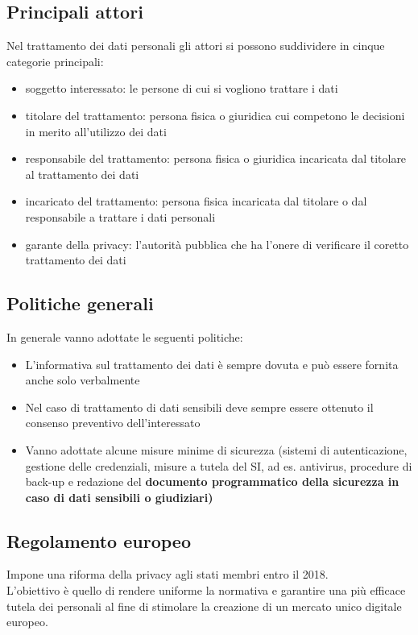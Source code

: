 \subsection{Principali attori}
Nel trattamento dei dati personali gli attori si possono suddividere in cinque categorie principali:
\begin{itemize}
	\item soggetto interessato: le persone di cui si vogliono trattare i dati
	\item titolare del trattamento: persona fisica o giuridica cui competono le decisioni in merito
all’utilizzo dei dati
	\item responsabile del trattamento: persona fisica o giuridica incaricata dal titolare al trattamento dei dati
	\item incaricato del trattamento: persona fisica incaricata dal titolare o dal responsabile a trattare i dati personali
	\item garante della privacy: l'autorit\`a pubblica che ha l'onere di verificare il coretto trattamento dei dati
\end{itemize}

\subsection{Politiche generali}
In generale vanno adottate le seguenti politiche:
\begin{itemize}
	\item L'informativa sul trattamento dei dati \`e sempre dovuta e pu\`o essere fornita anche solo verbalmente
	\item Nel caso di trattamento di dati sensibili deve sempre essere ottenuto il consenso preventivo dell’interessato
	\item Vanno adottate alcune misure minime di sicurezza (sistemi di autenticazione, gestione delle credenziali, misure a tutela del SI, ad es. antivirus, procedure di back-up e redazione del \bf documento programmatico della sicurezza \rm in caso di dati sensibili o giudiziari)
\end{itemize}

\subsection{Regolamento europeo}
\label{sub:regolamentoeuropeo}
Impone una riforma della privacy agli stati membri entro il 2018.\\
L'obiettivo \`e quello di rendere uniforme la normativa e garantire una pi\`u efficace tutela dei personali al fine di stimolare la creazione di un mercato unico digitale europeo.

